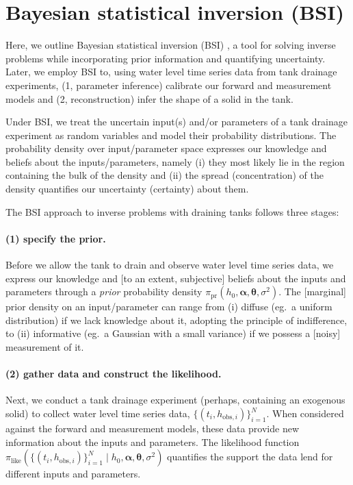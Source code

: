 \documentclass[openacc]{rsproca_new}%
\newcommand\thedata {$\{(t_i,h_{\text{obs}, i})\}_{i=1}^{N}$\xspace}
\newcommand\thedatanomath {\{(t_i,h_{\text{obs}, i})\}_{i=1}^{N}}
\begin{document}
\section{Bayesian statistical inversion (BSI)} \label{sec:bsi}
Here, we outline Bayesian statistical inversion (BSI)  \cite{calvetti2018inverse,waqar2023tutorial,kaipio2006statistical,dashti2013bayesian,allmaras2013estimating}, a tool for solving inverse problems while incorporating prior information and quantifying uncertainty. 
Later, we employ BSI to, using water level time series data from tank drainage experiments,  
(1, parameter inference) calibrate our forward and measurement models and 
(2, reconstruction) infer the shape of a solid in the tank.

Under BSI, we treat the uncertain input(s) and/or parameters of a tank drainage experiment as random variables and model their probability distributions.
The probability density over input/parameter space expresses our knowledge and beliefs about the inputs/parameters, namely 
(i) they most likely lie in the region containing the bulk of the density and (ii) the spread (concentration) of the density quantifies our uncertainty (certainty) about them. 


The BSI approach to inverse problems with draining tanks follows three stages:

\vspace{-\baselineskip}
\paragraph{(1) specify the prior.}
Before we allow the tank to drain and observe water level time series data, we express our knowledge and [to an extent, subjective] beliefs about the inputs and parameters through a \emph{prior} probability density $\pi_{\text{pr}}(h_0, \boldsymbol \alpha, \boldsymbol \theta, \sigma^2)$.
The [marginal] prior density on an input/parameter can range from 
(i) diffuse (eg.\ a uniform distribution) if we lack knowledge about it, adopting the principle of indifference, to 
(ii) informative (eg.\ a Gaussian with a small variance) if we possess a [noisy] measurement of it. 
\cite{van2021bayesian}

\vspace{-\baselineskip}
\paragraph{(2) gather data and construct the likelihood.}
Next, we conduct a tank drainage experiment (perhaps, containing an exogenous solid) to collect water level time series data, \thedata. 
When considered against the forward and measurement models, these data provide new information about the inputs and parameters. The likelihood function $\pi_{\text{like}}(\thedatanomath \mid h_0,\boldsymbol  \alpha, \boldsymbol \theta, \sigma^2 )$ quantifies the support the data lend for different inputs and parameters.
\end{document}
